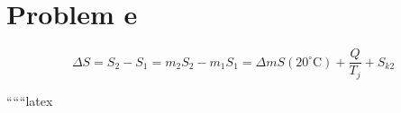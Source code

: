 \section*{Problem e}

\[
\Delta S = S_2 - S_1 = m_2 S_2 - m_1 S_1 = \Delta m S (20^\circ \text{C}) + \frac{Q}{T_j} + S_{k2}
\]

``````latex